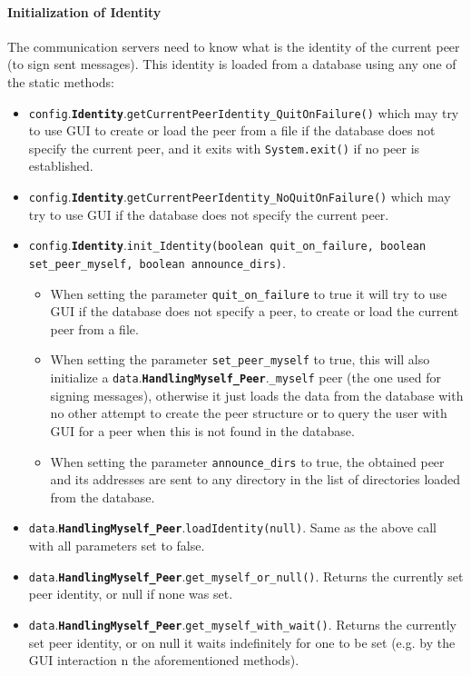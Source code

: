 \documentclass{book}
\newcommand{\pkg}[1]{{\tt #1}}
\newcommand{\cls}[1]{{\tt\bf #1}}
\newcommand{\mth}[1]{{\tt #1}}
\newcommand{\mmb}[1]{{\tt #1}}
\begin{document}
\paragraph{Initialization of Identity}
The communication servers need to know what is the identity of the current peer (to sign sent messages). This identity
is loaded from a database using any one of the static methods:
\begin{itemize}
\item
\pkg{config}.\cls{Identity}.\mth{getCurrentPeerIdentity\_QuitOnFailure()} which may try to use GUI to create or load the peer from a file if the database does not specify
the current peer, and it exits with \mth{System.exit()} if no peer is established.
\item
\pkg{config}.\cls{Identity}.\mth{getCurrentPeerIdentity\_NoQuitOnFailure()} which may try to use GUI if the database does not specify
the current peer.
\item
\pkg{config}.\cls{Identity}.\mth{init\_Identity(boolean quit\_on\_failure, boolean set\_peer\_myself, boolean announce\_dirs)}. 

	\begin{itemize}
	\item
	When setting the parameter \mmb{quit\_on\_failure} to true it will try to use GUI if the database does not specify a peer, to create
	or load the current peer from a file. 
	\item
	When setting the parameter \mmb{set\_peer\_myself} to true, this will also initialize a \pkg{data}.\cls{HandlingMyself\_Peer}.\mmb{\_myself} peer (the one used for signing messages),
	otherwise it just loads the data from the database with no other attempt to create the peer structure or to query the user with GUI for a 		peer
	when this is not found in the database.
	\item
	When setting the parameter \mmb{announce\_dirs} to true, the obtained peer and its addresses are sent to any directory
	in the list of directories loaded from the database.
	\end{itemize}
\item
\pkg{data}.\cls{HandlingMyself\_Peer}.\mth{loadIdentity(null)}. Same as the above call with all parameters set to false.
\item
\pkg{data}.\cls{HandlingMyself\_Peer}.\mth{get\_myself\_or\_null()}. Returns the currently set peer identity, or null if none was set.
\item
\pkg{data}.\cls{HandlingMyself\_Peer}.\mth{get\_myself\_with\_wait()}. Returns the currently set peer identity, or
on null it waits indefinitely for one to be set (e.g. by the GUI interaction n the aforementioned methods).
\end{itemize}
\end{document}
